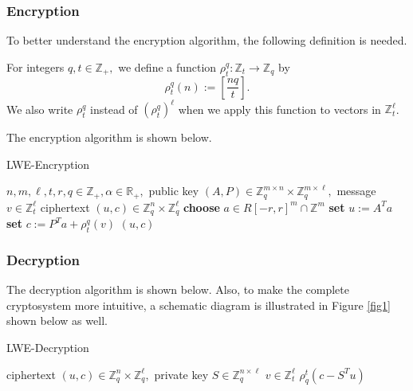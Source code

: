 \subsubsection{Encryption}

To better understand the encryption algorithm, the following definition is needed.

\begin{definition}
    For integers $q, t \in \mathbb{Z}_{+},$ we define a function $\rho_{t}^{q} : \mathbb{Z}_{t} \rightarrow \mathbb{Z}_{q}$ by $$\rho_{t}^{q}(n) :=\left[\frac{n q}{t}\right].$$ We also write $\rho_{t}^{q}$ instead of $\left(\rho_{t}^{q}\right)^{\ell}$ when we apply this function to vectors in $\mathbb{Z}_{t}^{\ell}$.\label{def1}
\end{definition}

The encryption algorithm is shown below.

\begin{algorithm}
    \caption{LWE-Encryption}
    \begin{algorithmic}[1]
        \Require $n, m, \ell, t, r, q \in \mathbb{Z}_{+}, \alpha \in \mathbb{R}_{+},$ public key $(A, P) \in \mathbb{Z}_{q}^{m \times n} \times \mathbb{Z}_{q}^{m \times \ell},$ message $v \in \mathbb{Z}_{t}^{\ell}$
        \Ensure ciphertext $(u, c) \in \mathbb{Z}_{q}^{n} \times \mathbb{Z}_{q}^{\ell}$
        \State \textbf{choose} $a \in R[-r, r]^{m} \cap \mathbb{Z}^{m}$
        \State \textbf{set} $u :=A^{T} a$
        \State \textbf{set} $c :=P^{T} a+\rho_{t}^{q}(v)$
        \State \Return $(u,c)$
    \end{algorithmic}
\end{algorithm}

\subsubsection{Decryption}

The decryption algorithm is shown below. Also, to make the complete cryptosystem more intuitive, a schematic diagram is illustrated in Figure \ref{fig1} shown below as well.

\begin{algorithm}
    \caption{LWE-Decryption}
    \begin{algorithmic}[1]
        \Require ciphertext $(u, c) \in \mathbb{Z}_{q}^{n} \times \mathbb{Z}_{q}^{\ell},$ private key $S \in \mathbb{Z}_{q}^{n \times \ell}$
        \Ensure $v \in \mathbb{Z}_{t}^{\ell}$
        \State \Return $\rho_{q}^{t}\left(c-S^{T} u\right)$
    \end{algorithmic}
\end{algorithm}

